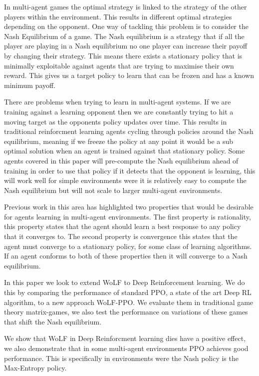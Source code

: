 \documentclass[conference]{IEEEtran}
\begin{document}
In multi-agent games the optimal strategy is linked to the strategy of the other players within the environment. This results in different optimal strategies depending on the opponent. One way of tackling this problem is to consider the Nash Equilibrium of a game. The Nash equilibrium is a strategy that if all the player are playing in a Nash equilibrium no one player can increase their payoff by changing their strategy. This means there exists a stationary policy that is minimally exploitable against agents that are trying to maximise their own reward. This gives us a target policy to learn that can be frozen and has a known minimum payoff.

There are problems when trying to learn in multi-agent systems. If we are training against a learning opponent then we are constantly trying to hit a moving target as the opponents policy updates over time. This results in traditional reinforcment learning agents cycling through policies around the Nash equilibrium, meaning if we freeze the policy at any point it would be a sub optimal solution when an agent is trained against that stationary policy. Some agents covered in this paper will pre-compute the Nash equilibrium ahead of training in order to use that policy if it detects that the opponent is learning, this will work well for simple environments were it is relatively easy to compute the Nash equilibrium but will not scale to larger multi-agent environments.

Previous work in this area has highlighted two properties that would be desirable for agents learning in multi-agent environments. The first property is rationality, this property states that the agent should learn a best response to any policy that it converges to. The second property is convergence this states that the agent must converge to a stationary policy, for some class of learning algorithms. If an agent conforms to both of these properties then it will converge to a Nash equilibrium.

In this paper we look to extend WoLF to Deep Reinforcement learning. We do this by comparing the performance of standard PPO, a state of the art Deep RL algorithm, to a new approach WoLF-PPO. We evaluate them in traditional game theory matrix-games, we also test the performance on variations of these games that shift the Nash equilibrium.

We show that WoLF in Deep Reinforcment learning dies have a positive effect, we also demonstrate that in some multi-agent environments PPO achieves good performance. This is specifically in environments were the Nash policy is the Max-Entropy policy.
\end{document}

